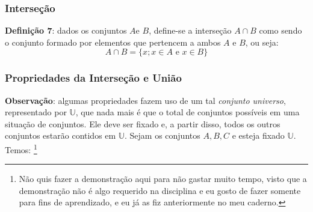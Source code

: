 \documentclass{article}
\begin{document}
\subsubsection{Interseção}
\textbf{Definição 7}: dados os conjuntos $A$e $B$, define-se a interseção $A \cap B$ como sendo o conjunto formado por elementos que pertencem a ambos $A$ e $B$, ou seja:
\begin{displaymath}
    A \cap B = \{ x; x \in A \text{ e } x \in B \}
\end{displaymath}

\subsubsection{Propriedades da Interseção e União}
\textbf{Observação}: algumas propriedades fazem uso de um tal \emph{conjunto universo}, representado por $\mathbb{U}$, que nada mais é que o total de conjuntos possíveis em uma situação de conjuntos. Ele deve ser fixado e, a partir disso, todos os outros conjuntos estarão contidos em $\mathbb{U}$.
Sejam os conjuntos $A, B, C$ e esteja fixado $\mathbb{U}$. Temos: \footnote{Não quis fazer a demonstração aqui para não gastar muito tempo, visto que a demonstração não é algo requerido na disciplina e eu gosto de fazer somente para fins de aprendizado, e eu já as fiz anteriormente no meu caderno.}
\end{document}
